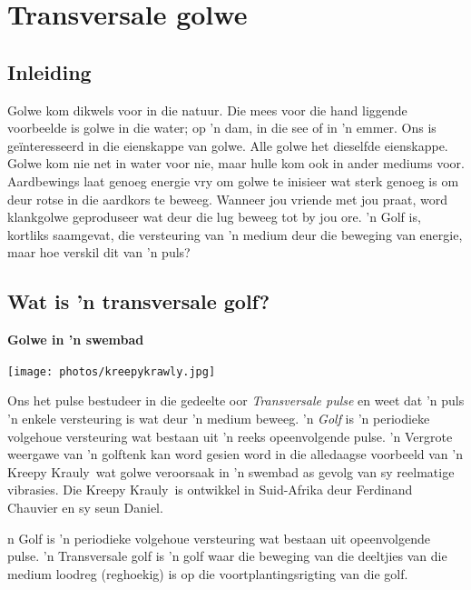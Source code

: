          \chapter{Transversale golwe}
    \setcounter{figure}{1}
    \setcounter{subfigure}{1}
    \label{m38806}
    \section{Inleiding}
            \nopagebreak
      \label{m38806*id317331}Golwe kom dikwels voor in die natuur. Die mees voor die hand liggende voorbeelde is golwe in die water; op 'n dam, in die see of in 'n emmer. Ons is geïnteresseerd in die eienskappe van golwe. Alle golwe het dieselfde eienskappe.
Golwe kom nie net in water voor nie, maar hulle kom ook in ander mediums voor. Aardbewings laat genoeg energie vry om golwe te inisieer wat sterk genoeg is om deur rotse in die aardkors te beweeg. Wanneer jou vriende met jou praat, word klankgolwe geproduseer wat deur die lug beweeg tot by jou ore. 'n Golf is, kortliks saamgevat, die versteuring van  'n medium deur die beweging van energie, maar hoe verskil dit van  'n puls?
    \section{Wat is 'n transversale golf?}

            \nopagebreak
\begin{minipage}{.5\textwidth}
\textbf{Golwe in 'n swembad}\par
 \texttt{[image: photos/kreepykrawly.jpg]}
\end{minipage}
\begin{minipage}{.5\textwidth}  
Ons het pulse bestudeer in die gedeelte oor \textit{Transversale pulse} en weet dat  'n puls  'n enkele versteuring is wat deur  'n medium beweeg. 'n \textsl{Golf} is 'n periodieke volgehoue versteuring wat bestaan uit  'n reeks opeenvolgende pulse. 'n Vergrote weergawe van  'n golftenk kan word  gesien word in die alledaagse voorbeeld van 'n Kreepy Krauly\textregistered\ wat golwe veroorsaak in  'n swembad as gevolg van sy reelmatige vibrasies. Die Kreepy Krauly\textregistered\ is ontwikkel in Suid-Afrika deur Ferdinand Chauvier en sy seun Daniel.\\
\end{minipage}
	   {n Golf is 'n periodieke volgehoue versteuring wat bestaan ​​uit opeenvolgende pulse.} 
 { 'n Transversale golf is 'n golf waar die beweging van die deeltjies van die medium loodreg (reghoekig) is op die voortplantingsrigting van die golf.} 


